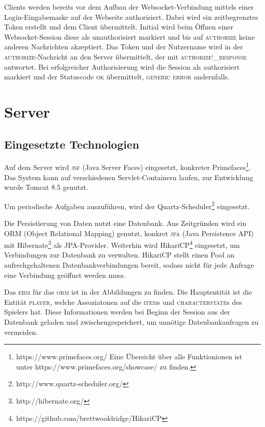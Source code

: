 \documentclass[ngerman,11pt]{report}
\begin{document}
Clients werden bereits vor dem Aufbau der Websocket-Verbindung mittels einer Login-Eingabemaske
auf der Webseite authorisiert. Dabei wird ein zeitbegrenztes Token erstellt und dem Client
übermittelt. Initial wird beim Öffnen einer Websocket-Session diese als unauthorisiert markiert
und bis auf \textsc{authorize} keine anderen Nachrichten akzeptiert. Das Token und der Nutzername wird in
der \textsc{authorize}-Nachricht an den Server übermittelt, der mit \textsc{authorize\char`_response} antwortet.
Bei erfolgreicher Authorisierung wird die Session als authorisiert markiert und der Statuscode \textsc{ok}
übermittelt, \textsc{generic error} andernfalls.

\chapter{Server}

\section{Eingesetzte Technologien}

Auf dem Server wird \textsc{jsf} (Java Server Faces) eingesetzt, konkreter
Primefaces\footnote{https://www.primefaces.org/ Eine Übersicht über alle
Funktionionen ist unter https://www.primefaces.org/showcase/ zu finden.}.
Das System kann auf verschiedenen Servlet-Containern laufen, zur Entwicklung
wurde Tomcat 8.5 genutzt.

Um periodische Aufgaben auszuführen, wird der
Quartz-Scheduler\footnote{http://www.quartz-scheduler.org/} eingesetzt.

Die Persistierung von Daten nutzt eine Datenbank. Aus Zeitgründen wird ein ORM
(Object Relational Mapping) genutzt, konkret \textsc{jpa} (Java Persistence API)
mit Hibernate\footnote{http://hibernate.org/} als JPA-Provider. Weiterhin wird
HikariCP\footnote{https://github.com/brettwooldridge/HikariCP} eingesetzt, um
Verbindungen zur Datenbank zu verwalten. HikariCP stellt einen Pool an
aufrechgehaltenen Datenbankverbindungen bereit, sodass nicht für jede Anfrage
eine Verbindung geöffnet werden muss.

Das \textsc{erm} für das \textsc{orm} ist in der Abbildungen zu finden. Die Hauptentität
ist die Entität \textsc{player}, welche Assoziatonen auf die \textsc{item}s und
\textsc{characterstate}s des Spielers hat. Diese Informationen werden bei Beginn der
Session aus der Datenbank geladen und zwischengespeichert, um unnötige Datenbankanfragen
zu vermeiden.
\end{document}
